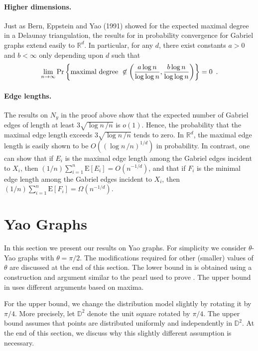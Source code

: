 \documentclass[lotsofwhite,charterfonts]{patmorin}
\newcommand{\RR}{\mathbb{R}}
\newcommand{\D}{\mathbb{D}}
\newcommand{\PROB}{\Pr}
\newcommand{\EXP}{\mathrm{E}}
\begin{document}
\paragraph{Higher dimensions.}
Just as Bern, Eppstein and Yao (1991) showed for the
expected maximal degree in a Delaunay triangulation, 
the results for in probability convergence for Gabriel graphs
extend easily to $\RR^d$. In particular,
for any $d$, there exist constants $a>0$ and $b < \infty$ 
only depending upon $d$ such that
\[
\lim_{n\to\infty} \PROB \left\{ \hbox{\rm maximal degree}~\not\in 
  \left( {a \log n \over \log \log n} , { b \log n \over \log \log n} \right)
  \right\} = 0 \enspace .
\]

\paragraph{Edge lengths.}
The results on $N_y$ in the proof above
show that the expected number of Gabriel
edges of length at least $3 \sqrt{\log n \,/n}$
is $o(1)$. Hence, the probability that the maximal edge
length exceeds $3 \sqrt{\log n \,/n}$ tends to zero.
In $\RR^d$, the maximal edge length is
easily shown to be $O((\log n \,/n)^{1/d})$ in
probability.
In contrast, one can show that if $E_i$ is the
maximal edge length among the Gabriel edges incident to $X_i$,
then $(1/n) \sum_{i=1}^n \EXP[E_i]= O(n^{-1/d})$,
and that if 
$F_i$ is the
minimal edge length among the Gabriel edges incident to $X_i$,
then $(1/n) \sum_{i=1}^n \EXP[F_i]= \Omega (n^{-1/d})$. 

\section{Yao Graphs}

In this section we present our results on Yao graphs.  For simplicity
we consider $\theta$-Yao graphs with $\theta=\pi/2$.  The modifications
required for other (smaller) values of $\theta$ are discussed at the end
of this section.  The lower bound in  is obtained
using a construction and argument similar to the pearl used to prove
.  The upper bound in 
uses different arguments based on maxima.

For the upper bound, we change the distribution model slightly by rotating
it by $\pi/4$.  More precisely, let $\D^2$ denote the unit square rotated
by $\pi/4$.  The upper bound assumes that points are distributed uniformly
and independently in $\D^2$. At the end of this section, we discuss why
this slightly different assumption is necessary.
\end{document}

